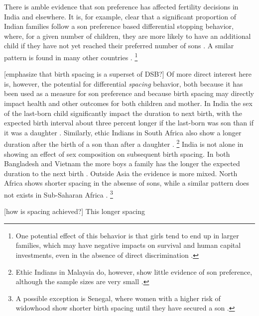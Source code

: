 There is amble evidence that son preference has affected fertility decisions in India and 
elsewhere.
It is, for example, clear that a significant proportion of Indian families follow a
son preference based differential stopping behavior, where, for a given number of
children, they are more likely to have an additional child if they have not yet
reached their preferred number of sons 
\citep{repetto72,Das1987,Arnold1997,arnold98,clark00,Basu2010,Barcellos2014}.
A smilar pattern is found in many other countries 
\citep[see, for example][]{larsen98,filmer09,Altindag2016}.%
\footnote{
One potential effect of this behavior is that girls tend to end up in larger families, 
which may have negative impacts on survival and human capital investments, even in 
the absence of direct discrimination \citet{Jensen2003,Kugler2017}.
}

[emphasize that birth spacing is a superset of DSB?]
Of more direct interest here is, however, the potential for differential \emph{spacing} 
behavior, 
both because it has been used as a measure for son preference and because birth spacing 
may directly impact health and other outcomes for both children and mother.
In India the sex of the last-born child significantly impact the duration to next birth,
with the expected birth interval about three percent longer if the last-born was son than
if it was a daughter \citep{Bhalotra2008,Kumar2016}.
Similarly, ethic Indians in South Africa also show a longer duration after the birth of a 
son than after a daughter \citep{Gangadharan2003}.%
\footnote{
Ethic Indians in Malaysia do, however, show little evidence of son preference, although
the sample sizes are very small \citep{Pong1994}.
}
India is not alone in showing an effect of sex composition on subsequent birth spacing.
In both Bangladesh and Vietnam the more boys a family has the longer the expected duration 
to the next birth \citep{Haughton1995,Haughton1996,Rahman1993,Soest2018}.
Outside Asia the evidence is more mixed.
North Africa shows shorter spacing in the absense of sons, while a similar pattern does
not exists in Sub-Saharan Africa \citep{Rossi2015}.%
\footnote{
A possible exception is Senegal, where women with a higher risk of widowhood show
shorter birth spacing until they have secured a son \citep{Lambert2016}.
}







[how is spacing achieved?]
This longer spacing 
\citep{Rahman1993}
\citep{Jayachandran2011}



